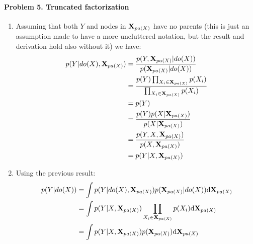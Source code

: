 \documentclass{amsmlaj}
\begin{document}
\paragraph{Problem 5. Truncated factorization}
\begin{sol}
	\begin{enumerate}
		\item Assuming that both $Y$ and nodes in $\bm{\mathbf{X}}_{pa(X)}$ have no parents
			(this is just an assumption made to have a more uncluttered notation, but
			the result and derivation hold also without it) we have:
			\begin{align}
				p(Y|do(X),\bm{\mathbf{X}}_{pa(X)})
				&=\frac{p(Y,\bm{\mathbf{X}}_{pa(X)}|do(X))}{p(\bm{\mathbf{X}}_{pa(X)}|do(X))} \\
				&=\frac{p(Y)\prod_{X_i \in \bm{\mathbf{X}}_{pa(X)}}p(X_i)}{\prod_{X_i \in \bm{\mathbf{X}}_{pa(X)}}p(X_i)} \\
				&=p(Y) \\
				&=\frac{p(Y)p(X|\bm{\mathbf{X}}_{pa(X)})}{p(X|\bm{\mathbf{X}}_{pa(X)})} \\
				&=\frac{p(Y,X,\bm{\mathbf{X}}_{pa(X)})}{p(X,\bm{\mathbf{X}}_{pa(X)})} \\
				&=p(Y|X,\bm{\mathbf{X}}_{pa(X)})
			\end{align}
		\item Using the previous result:
			\begin{align}
				p(Y|do(X))
				&=\int p(Y|do(X),\bm{\mathbf{X}}_{pa(X)})p(\bm{\mathbf{X}}_{pa(X)}|do(X))\mathrm{d}\bm{\mathbf{X}}_{pa(X)} \\
				&=\int p(Y|X,\bm{\mathbf{X}}_{pa(X)})\prod_{X_i \in \bm{\mathbf{X}}_{pa(X)}}p(X_i)\mathrm{d}\bm{\mathbf{X}}_{pa(X)} \\
				&=\int p(Y|X,\bm{\mathbf{X}}_{pa(X)})p(\bm{\mathbf{X}}_{pa(X)})\mathrm{d}\bm{\mathbf{X}}_{pa(X)}
			\end{align}
	\end{enumerate}
\end{sol}
\end{document}
